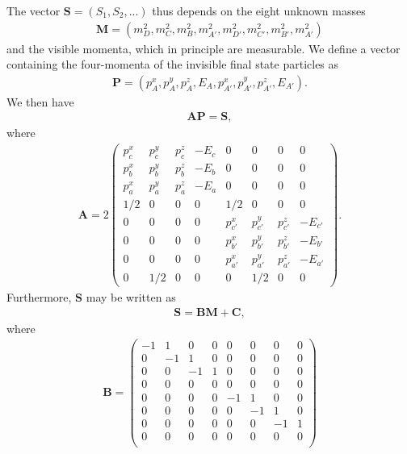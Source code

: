 \documentclass[twoside,english]{uiofysmaster}
\begin{document}
The vector $\mathbf{S} = (S_1, S_2, ...)$ thus depends on the eight unknown masses 
\begin{align}
	\mathbf{M} = (m_D^2, m_C^2, m_B^2, m_{A'}^2, m_{D'}^2, m_{C'}^2, m_{B'}^2, m_{A'}^2)
\end{align}
and the visible momenta, which in principle are measurable. We define a vector containing the four-momenta of the invisible final state particles as
\begin{align}
	\mathbf{P} = (p_A^x, p_A^y, p_A^z, E_A, p_{A'}^x, p_{A'}^y, p_{A'}^z, E_{A'}). \label{eq:Pvec}
\end{align}
We then have
\begin{align}
	\mathbf{A}\mathbf{P} = \mathbf{S},\label{eq:APS}
\end{align}
where
\begin{align}
	\mathbf{A} = 2 \begin{pmatrix}
						p_c^x & p_c^y & p_c^z & -E_c & 0 & 0 & 0 & 0 \\
						p_b^x & p_b^y & p_b^z & -E_b & 0 & 0 & 0 & 0 \\
						p_a^x & p_a^y & p_a^z & -E_a & 0 & 0 & 0 & 0 \\
						1/2 & 0 & 0 & 0 & 1/2 & 0 & 0 & 0\\
						0 & 0 & 0 & 0 & p_{c'}^x & p_{c'}^y & p_{c'}^z & -E_{c'} \\
						0 & 0 & 0 & 0 & p_{b'}^x & p_{b'}^y & p_{b'}^z & -E_{b'} \\
						0 & 0 & 0 & 0 & p_{a'}^x & p_{a'}^y & p_{a'}^z & -E_{a'} \\
						0 & 1/2 & 0 & 0 & 0 & 1/2 & 0 & 0
					\end{pmatrix}. \label{eq:Amatrix_orig}
\end{align}
Furthermore, $\mathbf{S}$ may be written as 
\begin{align}
	\mathbf{S} = \mathbf{B} \mathbf{M} + \mathbf{C},\label{eq:SBMC}
\end{align}
where
\begin{align}
	\mathbf{B} = \begin{pmatrix}
					-1 & 1 & 0 & 0 & 0 & 0 & 0 & 0 \\
					0 & -1 & 1 & 0 & 0 & 0 & 0 & 0 \\
					0 & 0 & -1 & 1 & 0 & 0 & 0 & 0 \\
					0 & 0 & 0 & 0 & 0 & 0 & 0 & 0 \\
					0 & 0 & 0 & 0 & -1 & 1 & 0 & 0 \\
					0 & 0 & 0 & 0 & 0 & -1 & 1 & 0 \\
					0 & 0 & 0 & 0 & 0 & 0 & -1 & 1 \\
					0 & 0 & 0 & 0 & 0 & 0 & 0 & 0 \\
	\end{pmatrix}
\end{align}
\end{document}
